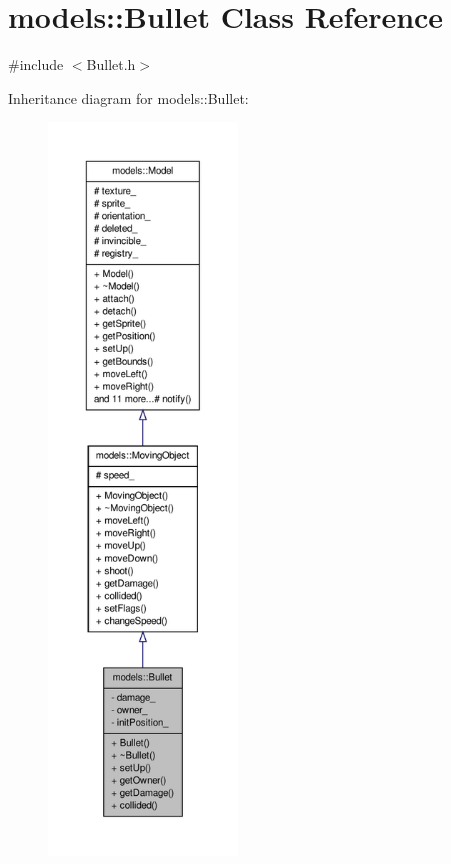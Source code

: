 \hypertarget{classmodels_1_1Bullet}{\section{models\-:\-:\-Bullet \-Class \-Reference}
\label{d5/dd0/classmodels_1_1Bullet}
}


{\ttfamily \#include $<$\-Bullet.\-h$>$}



\-Inheritance diagram for models\-:\-:\-Bullet\-:\nopagebreak
\begin{figure}[H]
\begin{center}
\leavevmode
\includegraphics[height=550pt]{d7/df3/classmodels_1_1Bullet__inherit__graph}
\end{center}
\end{figure}


